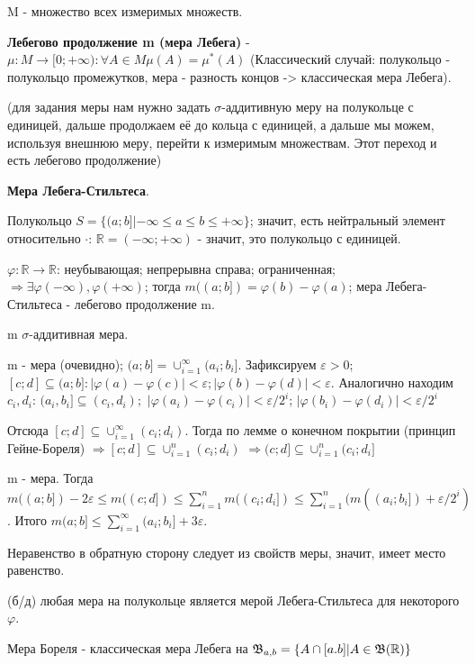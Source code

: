 M - множество всех измеримых множеств.

\Def \textbf{Лебегово продолжение m (мера Лебега)} - $\mu: M \rightarrow [0; +\infty): \forall A \in M \mu (A) = \mu^* (A)$ (Классический случай: полукольцо - полукольцо промежутков, мера - разность концов -> классическая мера Лебега).

(\Idea для задания меры нам нужно задать $\sigma$-аддитивную меру на полукольце с единицей, дальше продолжаем её до кольца с единицей, а дальше мы можем, используя внешнюю меру, перейти к измеримым множествам. Этот переход и есть лебегово продолжение)

\vspace{5pt}

\Def \textbf{Мера Лебега-Стильтеса}.

Полукольцо $S = \{ (a; b] | -\infty \leqslant a \leqslant b \leqslant +\infty \}$; значит, есть нейтральный элемент относительно $\cdot$: $\mathbb{R} = (-\infty; +\infty)$ - значит, это полукольцо с единицей.

$\varphi: \mathbb{R} \rightarrow \mathbb{R}$: неубывающая; непрерывна справа; ограниченная; $\Rightarrow \exists \varphi(-\infty), \varphi(+\infty)$; тогда $m((a; b]) = \varphi(b) - \varphi(a)$; мера Лебега-Стильтеса - лебегово продолжение m.

\Th m $\sigma$-аддитивная мера.

\Proof m - мера (очевидно); $(a; b] = \cup_{i = 1}^{\infty} (a_i; b_i]$.
Зафиксируем $\varepsilon > 0$; $[c; d] \subseteq (a; b]: |\varphi(a) - \varphi(c)| < \varepsilon; |\varphi(b) - \varphi(d)| < \varepsilon$. Аналогично находим $c_i, d_i$: $(a_i, b_i] \subseteq (c_i, d_i); $ $|\varphi(a_i) - \varphi(c_i)| < \varepsilon / 2^i$; $|\varphi(b_i) - \varphi(d_i)| < \varepsilon / 2^i$

Отсюда $[c; d] \subseteq \cup_{i = 1}^{\infty} (c_i; d_i)$. Тогда по лемме о конечном покрытии (принцип Гейне-Бореля) $\Rightarrow [c; d] \subseteq \cup_{i = 1}^{n} (c_i; d_i)$ $\Rightarrow (c; d] \subseteq \cup_{i = 1}^{n} (c_i; d_i]$

m - мера. Тогда $m((a; b]) - 2\varepsilon \leqslant m((c; d]) \leqslant \sum_{i=1}^{n} m((c_i; d_i]) \leqslant \sum_{i=1}^{n} (m((a_i; b_i]) + \varepsilon / 2^i)$. Итого $m(a; b] \leqslant \sum_{i=1}^\infty (a_i; b_i] + 3 \varepsilon. $

Неравенство в обратную сторону следует из свойств меры, значит, имеет место равенство.\EndProof

\Note (б/д) любая мера на полукольце является мерой Лебега-Стильтеса для некоторого $\varphi$.

\Def Мера Бореля - классическая мера Лебега на $\mathfrak{B}_{a, b} = \{ A \cap [a. b] | A \in \mathfrak{B}(\mathbb{R})\}$